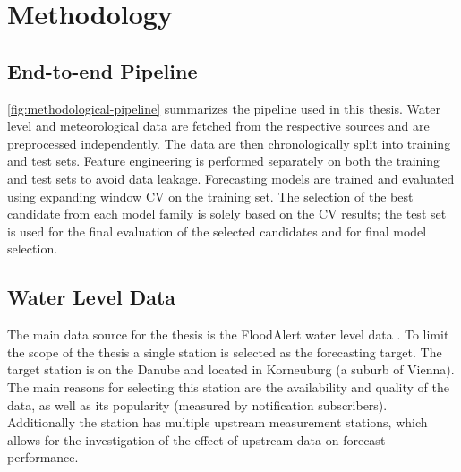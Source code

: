 \chapter{Methodology}

\section{End-to-end Pipeline}
\autoref{fig:methodological-pipeline} summarizes the pipeline used in this thesis. Water level and meteorological data are fetched from the respective sources and are preprocessed independently. The data are then chronologically split into training and test sets. Feature engineering is performed separately on both the training and test sets to avoid data leakage. Forecasting models are trained and evaluated using expanding window \ac{CV} on the training set. The selection of the best candidate from each model family is solely based on the \ac{CV} results; the test set is used for the final evaluation of the selected candidates and for final model selection.

\section{Water Level Data}
The main data source for the thesis is the FloodAlert water level data \cite{FloodAlertWaterLevels}. To limit the scope of the thesis a single station is selected as the forecasting target. The target station is on the Danube and located in Korneuburg (a suburb of Vienna). The main reasons for selecting this station are the availability and quality of the data, as well as its popularity 
(measured by notification subscribers).
Additionally the station has multiple upstream measurement stations, which allows for the investigation of the effect of upstream data on forecast performance. 

